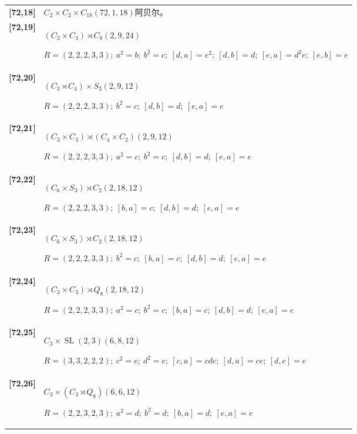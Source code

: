 \documentclass[UTF8,fontset=fandol,11pt,a4paper]{ctexart}
\begin{document}
\begin{longtable}{@{}p{17mm}>{\raggedright\arraybackslash}p{141mm}@{}}
\textbf{[72,18]} & $C_{2}\times C_{2}\times C_{18}$\quad $(72,1,18)$\quad 阿贝尔。\\[3pt]

\textbf{[72,19]} & $(C_{3}\times C_{3})\rtimes C_{8}$\quad $(2,9,24)$\par\(R=(2,2,2,3,3);\allowbreak\ a^{2}=b;\allowbreak\ b^{2}=c;\allowbreak\ [d,a]=e^{2};\allowbreak\ [d,b]=d;\allowbreak\ [e,a]=d^{2}e;\allowbreak\ [e,b]=e\)\\[3pt]

\textbf{[72,20]} & $(C_{3}\rtimes C_{4})\times S_{3}$\quad $(2,9,12)$\par\(R=(2,2,2,3,3);\allowbreak\ b^{2}=c;\allowbreak\ [d,b]=d;\allowbreak\ [e,a]=e\)\\[3pt]

\textbf{[72,21]} & $(C_{3}\times C_{3})\rtimes (C_{4}\times C_{2})$\quad $(2,9,12)$\par\(R=(2,2,2,3,3);\allowbreak\ a^{2}=c;\allowbreak\ b^{2}=c;\allowbreak\ [d,b]=d;\allowbreak\ [e,a]=e\)\\[3pt]

\textbf{[72,22]} & $(C_{6}\times S_{3})\rtimes C_{2}$\quad $(2,18,12)$\par\(R=(2,2,2,3,3);\allowbreak\ [b,a]=c;\allowbreak\ [d,b]=d;\allowbreak\ [e,a]=e\)\\[3pt]

\textbf{[72,23]} & $(C_{6}\times S_{3})\rtimes C_{2}$\quad $(2,18,12)$\par\(R=(2,2,2,3,3);\allowbreak\ b^{2}=c;\allowbreak\ [b,a]=c;\allowbreak\ [d,b]=d;\allowbreak\ [e,a]=e\)\\[3pt]

\textbf{[72,24]} & $(C_{3}\times C_{3})\rtimes Q_{8}$\quad $(2,18,12)$\par\(R=(2,2,2,3,3);\allowbreak\ a^{2}=c;\allowbreak\ b^{2}=c;\allowbreak\ [b,a]=c;\allowbreak\ [d,b]=d;\allowbreak\ [e,a]=e\)\\[3pt]

\textbf{[72,25]} & $C_{3}\times \operatorname{SL}(2,3)$\quad $(6,8,12)$\par\(R=(3,3,2,2,2);\allowbreak\ c^{2}=e;\allowbreak\ d^{2}=e;\allowbreak\ [c,a]=cde;\allowbreak\ [d,a]=ce;\allowbreak\ [d,c]=e\)\\[3pt]

\textbf{[72,26]} & $C_{3}\times (C_{3}\rtimes Q_{8})$\quad $(6,6,12)$\par\(R=(2,2,3,2,3);\allowbreak\ a^{2}=d;\allowbreak\ b^{2}=d;\allowbreak\ [b,a]=d;\allowbreak\ [e,a]=e\)\\[3pt]


\end{longtable}
\end{document}
